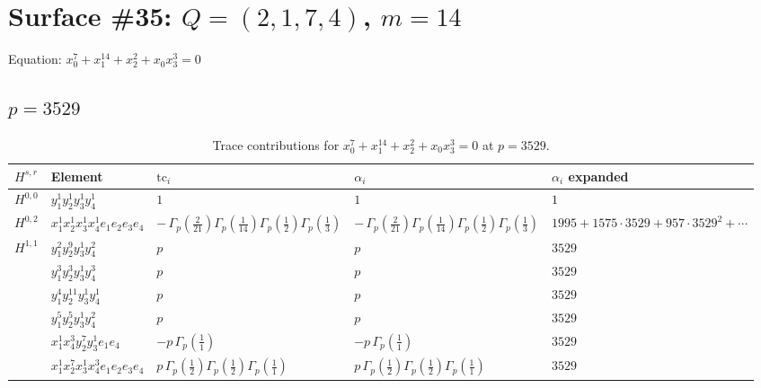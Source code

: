 \documentclass[11pt]{article}
\begin{document}
\newpage

\section*{Surface \#35: $Q=(2, 1, 7, 4)$, $m=14$}

Equation: $x_0^{7} + x_1^{14} + x_2^{2} + x_0 x_3^{3} = 0$

\subsection*{$p = 3529$}

\begin{table}[ht]
\centering
\caption{Trace contributions for $x_0^{7} + x_1^{14} + x_2^{2} + x_0 x_3^{3} = 0$ at $p=3529$.}\label{tab:deformed-35}
\renewcommand{\arraystretch}{1.1}
{\scriptsize
\begin{tabular}{@{}lllll@{}}
\toprule
$H^{s,r}$ & Element & $\mathrm{tc}_i$ & $\alpha_i$ & $\alpha_i$ expanded \\
\midrule
$H^{0,0}$ & $y_{1}^{1} y_{2}^{1} y_{3}^{1} y_{4}^{1}$ & $1$ & $1$ & $1$ \\
\midrule
$H^{0,2}$ & $x_{1}^{1} x_{2}^{1} x_{3}^{1} x_{4}^{1}  e_{1} e_{2} e_{3} e_{4}$ & $- \, \Gamma_p \left( \frac{2}{21} \right) \Gamma_p \left( \frac{1}{14} \right) \Gamma_p \left( \frac{1}{2} \right) \Gamma_p \left( \frac{1}{3} \right)$ & $- \, \Gamma_p \left( \frac{2}{21} \right) \Gamma_p \left( \frac{1}{14} \right) \Gamma_p \left( \frac{1}{2} \right) \Gamma_p \left( \frac{1}{3} \right)$ & $1995{+}1575{\cdot}3529{+}957{\cdot}3529^{2}{+}\cdots$ \\
\midrule
$H^{1,1}$ & $y_{1}^{2} y_{2}^{9} y_{3}^{1} y_{4}^{2}$ & $p \,$ & $p \,$ & $3529$ \\
 & $y_{1}^{3} y_{2}^{3} y_{3}^{1} y_{4}^{3}$ & $p \,$ & $p \,$ & $3529$ \\
 & $y_{1}^{4} y_{2}^{11} y_{3}^{1} y_{4}^{1}$ & $p \,$ & $p \,$ & $3529$ \\
 & $y_{1}^{5} y_{2}^{5} y_{3}^{1} y_{4}^{2}$ & $p \,$ & $p \,$ & $3529$ \\
 & $x_{1}^{1} x_{4}^{3} y_{2}^{7} y_{3}^{1} e_{1} e_{4}$ & $- p \, \Gamma_p \left( \frac{1}{1} \right)$ & $- p \, \Gamma_p \left( \frac{1}{1} \right)$ & $3529$ \\
 & $x_{1}^{1} x_{2}^{7} x_{3}^{1} x_{4}^{3}  e_{1} e_{2} e_{3} e_{4}$ & $p \, \Gamma_p \left( \frac{1}{2} \right) \Gamma_p \left( \frac{1}{2} \right) \Gamma_p \left( \frac{1}{1} \right)$ & $p \, \Gamma_p \left( \frac{1}{2} \right) \Gamma_p \left( \frac{1}{2} \right) \Gamma_p \left( \frac{1}{1} \right)$ & $3529$ \\

\end{tabular}}
\end{table}
\end{document}
